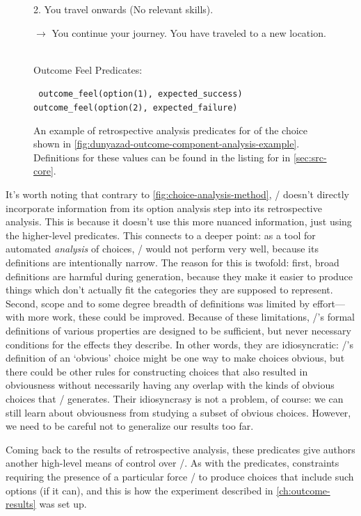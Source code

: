 \begin{enumerate}[leftmargin=1.4em]
\begin{figure}[!b]
{{{\begin{hangparas}{1.3em}{1}
2. You travel onwards (No relevant skills).\\
\ind \parbox{0.95\linewidth}{$\rightarrow$ You continue your journey. You have traveled to a new location.}
\end{hangparas}
} \vind \\
Outcome Feel Predicates:\svind \\
\ind \parbox{0.9\textwidth}{ \tt
{} outcome\_feel(option(1), expected\_success) \\
 outcome\_feel(option(2), expected\_failure) \\
}
}
}
\caption[\dunyazad/ retrospective analysis example]{An example of retrospective analysis predicates for of the choice shown in \cref{fig:dunyazad-outcome-component-analysis-example}. Definitions for these  values can be found in the listing for  in \cref{sec:src-core}.}
\label{fig:dunyazad-retrospective-analysis-example}
\end{figure}


It's worth noting that contrary to \cref{fig:choice-analysis-method}, \dunyazad/ doesn't directly incorporate information from its option analysis step into its retrospective analysis.
%
This is because it doesn't use this more nuanced information, just using the higher-level  predicates.
%
This connects to a deeper point: as a tool for automated \emph{analysis} of choices, \dunyazad/ would not perform very well, because its definitions are intentionally narrow.
%
The reason for this is twofold: first, broad definitions are harmful during generation, because they make it easier to produce things which don't actually fit the categories they are supposed to represent.
%
Second, scope and to some degree breadth of definitions was limited by effort---with more work, these could be improved.
%
Because of these limitations, \dunyazad/'s formal definitions of various properties are designed to be sufficient, but never necessary conditions for the effects they describe.
%
In other words, they are idiosyncratic: \dunyazad/'s definition of an `obvious' choice might be one way to make choices obvious, but there could be other rules for constructing choices that also resulted in obviousness without necessarily having any overlap with the kinds of obvious choices that \dunyazad/ generates.
%
Their idiosyncrasy is not a problem, of course: we can still learn about obviousness from studying a subset of obvious choices.
%
However, we need to be careful not to generalize our results too far.


Coming back to the results of retrospective analysis, these  predicates give authors another high-level means of control over \dunyazad/.
%
As with the  predicates, constraints requiring the presence of a particular  force \dunyazad/ to produce choices that include such options (if it can), and this is how the experiment described in \cref{ch:outcome-results} was set up.

\end{enumerate}


